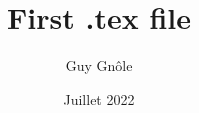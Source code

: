 \documentclass[12pt,a4paper]{report}
\title{First .tex file}
\author{Guy Gn\^{o}le}
\date{Juillet 2022}
\begin{document}
\begin{titlepage}
\maketitle
\end{titlepage}

\end{document}
